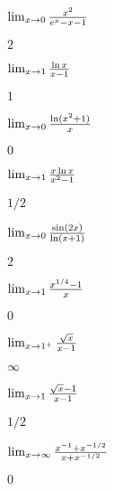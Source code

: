 \begin{exercises}
\begin{exercise} $\lim_{x\to0}{x^2\over e^x-x-1}$
\begin{answer} $2$
\end{answer}\end{exercise}

\begin{exercise} $\lim_{x\to1}{\ln x\over x-1}$
\begin{answer} $1$
\end{answer}\end{exercise}

\begin{exercise} $\lim_{x\to0}{\ln(x^2+1)\over x}$
\begin{answer} $0$
\end{answer}\end{exercise}

\begin{exercise} $\lim_{x\to1}{x\ln x\over x^2-1}$
\begin{answer} $1/2$
\end{answer}\end{exercise}

\begin{exercise} $\lim_{x\to0}{\sin(2x)\over\ln(x+1)}$
\begin{answer} $2$
\end{answer}\end{exercise}

\begin{exercise} $\lim_{x\to1}{x^{1/4}-1\over x}$
\begin{answer} $0$
\end{answer}\end{exercise}

\begin{exercise} $\lim_{x\to1^+}{\sqrt{x}\over x-1}$
\begin{answer} $\infty$
\end{answer}\end{exercise}

\begin{exercise} $\lim_{x\to1}{\sqrt{x}-1\over x-1}$
\begin{answer} $1/2$
\end{answer}\end{exercise}

\begin{exercise} $\lim_{x\to\infty}{x^{-1}+x^{-1/2}\over x+x^{-1/2}}$
\begin{answer} $0$
\end{answer}\end{exercise}


\end{exercises}

